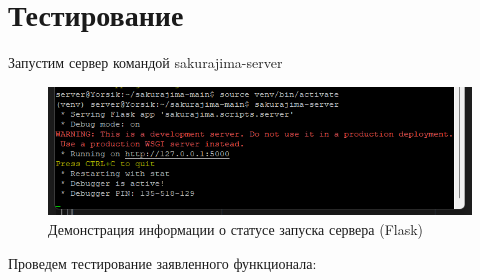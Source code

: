 \chapter{Тестирование}
\label{cha:research}

Запустим сервер командой sakurajima-server

\begin{figure}
  \centering
  \includegraphics[width=.9\textwidth]{graphics/test/dev_server_run.png}
  \caption{Демонстрация информации о статусе запуска сервера (Flask)}
  \label{fig:test1}
\end{figure}

Проведем тестирование заявленного функционала:

